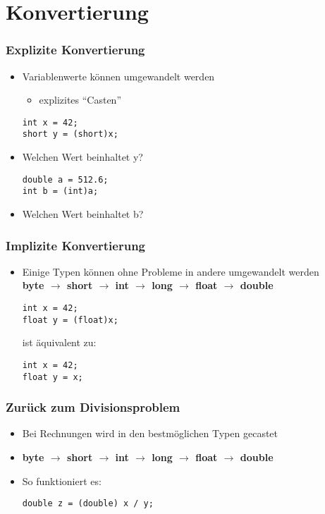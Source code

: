 \documentclass[final]{beamer}
\newcommand{\keyWord}[1]{\textbf{#1}}
\newcommand{\ra}{\ensuremath{\rightarrow}\xspace}
\begin{document}
\section{Konvertierung}
\begin{frame}[fragile]
  \frametitle{Explizite Konvertierung}
  \begin{itemize}
    \item Variablenwerte können umgewandelt werden 
    \begin{itemize}
      \item explizites "`Casten"'
    \end{itemize}
    \begin{lstlisting}
int x = 42;
short y = (short)x;
    \end{lstlisting}
    \item[] Welchen Wert beinhaltet y? \qquad {}
    \begin{lstlisting}
double a = 512.6;
int b = (int)a;
    \end{lstlisting}
    \item[] Welchen Wert beinhaltet b? \qquad {}
  \end{itemize}
\end{frame}

\begin{frame}[fragile]
  \frametitle{Implizite Konvertierung}
  \begin{itemize}
    \item[] Einige Typen können ohne Probleme in andere umgewandelt werden\\
\keyWord{byte \ra short \ra int \ra long \ra float \ra double}
    \begin{lstlisting}
int x = 42;
float y = (float)x;
    \end{lstlisting}
    ist äquivalent zu:
    \begin{lstlisting}
int x = 42;
float y = x;
    \end{lstlisting}
  \end{itemize}
\end{frame}

\begin{frame}[fragile]
  \frametitle{Zurück zum Divisionsproblem}
  \begin{itemize}
    \begin{lstlisting}
int x = 7;

int y = 2;

double z = x / y;
    \end{lstlisting}
    \item Bei Rechnungen wird in den bestmöglichen Typen gecastet
    
    \item[]\keyWord{byte \ra short \ra int \ra long \ra float \ra double}
    \item So funktioniert es:
    \begin{lstlisting}
double z = (double) x / y;
    \end{lstlisting}    
  \end{itemize}
\end{frame}
\end{document}

